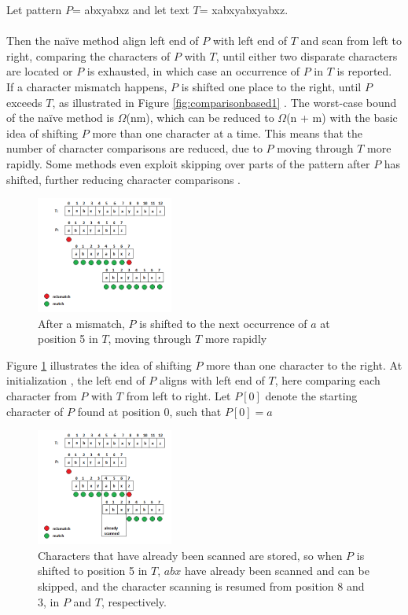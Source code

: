 \documentclass[12pt]{article} %
\begin{document}
Let pattern $P$=  abxyabxz and let text $T$= xabxyabxyabxz.
\\ \\
Then the naïve method align left end of $P$  with left end of $T$ and scan from left to right, comparing the characters of $P$ with $T$, until either two disparate characters are located or $P$ is exhausted, in which case an occurrence of $P$ in $T$ is reported. If a character mismatch happens, $P$ is shifted one place to the right, until $P$ exceeds $T$, as illustrated in Figure \ref{fig:comparisonbased1} \cite{gusfield}.
The worst-case bound of the naïve method is $\Omega$(nm), which can be reduced to $\Omega$(n + m) with the basic idea of shifting $P$ more than one character at a time. This means that the number of character comparisons are reduced, due to $P$ moving through $T$ more rapidly. Some methods even exploit skipping over parts of the pattern after $P$ has shifted, further reducing character comparisons \cite{gusfield}. 
\begin{figure}[H]
    \centering
    \includegraphics[width=0.4\textwidth]{comparisonbased2}
    \captionsetup{width=0.8\textwidth}
    \caption{After a mismatch, $P$ is shifted to the next occurrence of $a$ at position 5 in $T$, moving through $T$ more rapidly}
    \label{fig:comparisonbased2}
\end{figure}
\newline   
Figure \ref{fig:comparisonbased2}  illustrates the idea of shifting $P$ more than one character to the right. At initialization , the left end of $P$ aligns with left end of $T$, here comparing each character from $P$ with $T$ from left to right.
\newline
Let $P[0]$ denote the starting character of $P$ found at position 0, such that $P[0]=a$
\newline
\begin{figure}[H]
    \centering
    \includegraphics[width=0.4\textwidth]{comparisonbased3}
    \captionsetup{width=0.8\textwidth}
    \caption{Characters that have already been scanned are stored, so when $P$ is shifted to position 5 in $T$, $abx$ have already been scanned and can be skipped, and the character scanning is resumed from position 8 and 3, in $P$ and $T$, respectively.}
    \label{fig:comparisonbased3}
\end{figure}
\end{document}
